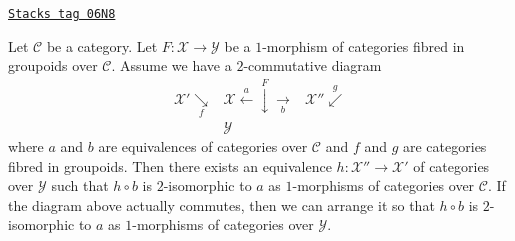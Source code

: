 \begin{lemma}
\label{categories-lemma-amelioration-unique}
\href{https://stacks.math.columbia.edu/tag/06N8}{\texttt{Stacks tag 06N8}}

Let $\mathcal{C}$ be a category. Let $F : \mathcal{X} \to \mathcal{Y}$
be a $1$-morphism of categories fibred in groupoids over $\mathcal{C}$.
Assume we have a $2$-commutative diagram
$$
\begin{array}{ccc}\mathcal{X}' \underset{f}{\searrow} & \mathcal{X} \overset{a}{\longleftarrow}\overset{F}{\downarrow}\underset{b}{\longrightarrow} & \mathcal{X}'' \overset{g}{\swarrow} \\  & \mathcal{Y} & \end{array}
$$
where $a$ and $b$ are equivalences of categories over $\mathcal{C}$
and $f$ and $g$ are categories fibred in groupoids. Then there exists
an equivalence $h : \mathcal{X}'' \to \mathcal{X}'$ of categories over
$\mathcal{Y}$ such that $h \circ b$ is $2$-isomorphic to $a$ as $1$-morphisms
of categories over $\mathcal{C}$. If the diagram above actually commutes, then
we can arrange it so that $h \circ b$ is $2$-isomorphic to $a$ as
$1$-morphisms of categories over $\mathcal{Y}$.
\end{lemma}

